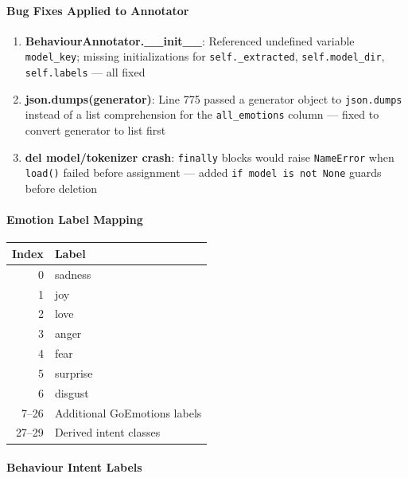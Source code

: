 \documentclass[11pt,a4paper]{article}
\begin{document}
\paragraph{Bug Fixes Applied to Annotator}

\begin{enumerate}[label=\textcolor{red}{\textsf{!}}\ Fix \arabic*., leftmargin=*]
\item \textbf{BehaviourAnnotator.\_\_init__}: Referenced undefined variable \texttt{model\_key}; missing initializations for \texttt{self.\_extracted}, \texttt{self.model\_dir}, \texttt{self.labels} --- all fixed
\item \textbf{json.dumps(generator)}: Line 775 passed a generator object to \texttt{json.dumps} instead of a list comprehension for the \texttt{all\_emotions} column --- fixed to convert generator to list first
\item \textbf{del model/tokenizer crash}: \texttt{finally} blocks would raise \texttt{NameError} when \texttt{load()} failed before assignment --- added \texttt{if model is not None} guards before deletion
\end{enumerate}

\paragraph{Emotion Label Mapping}

\begin{center}
\begin{tabular}{rl}
\toprule
\textbf{Index} & \textbf{Label} \\
\midrule
0 & sadness \\
1 & joy \\
2 & love \\
3 & anger \\
4 & fear \\
5 & surprise \\
6 & disgust \\
7--26 & Additional GoEmotions labels \\
27--29 & Derived intent classes \\
\bottomrule
\end{tabular}
\end{center}

\paragraph{Behaviour Intent Labels}
\end{document}
